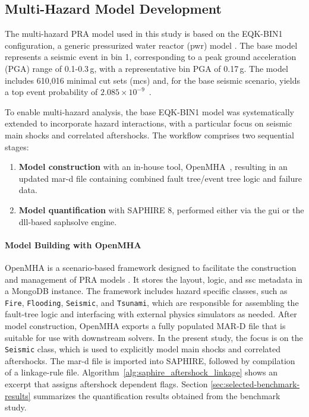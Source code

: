 \subsection{Multi-Hazard Model Development}

The multi-hazard PRA model used in this study is based on the EQK-BIN1 configuration, a generic pressurized water reactor (\acrshort{pwr}) model \cite{aras_generic_2024}. The base model represents a seismic event in bin 1, corresponding to a peak ground acceleration (PGA) range of 0.1-0.3\,g, with a representative bin PGA of 0.17\,g. The model includes 610,016 minimal cut sets (\acrshort{mcs}) and, for the base seismic scenario, yields a top event probability of $2.085 \times 10^{-9}$~\cite{batikh_time-dependent_2023}.

To enable multi-hazard analysis, the base EQK-BIN1 model was systematically extended to incorporate hazard interactions, with a particular focus on seismic main shocks and correlated aftershocks. The workflow comprises two sequential stages:

\begin{enumerate}
  \item \textbf{Model construction} with an in-house tool, OpenMHA~\cite{Batikh2024OpenMHA}, resulting in an updated \acrshort{mar-d} file containing combined fault tree/event tree logic and failure data.
  \item \textbf{Model quantification} with SAPHIRE 8, performed either via the \acrshort{gui} or the \acrshort{dll}-based \acrshort{saphsolve} engine.
\end{enumerate}

\paragraph{Model Building with OpenMHA}
OpenMHA is a scenario-based framework designed to facilitate the construction and management of PRA models \cite{batikh_towards_2025_a}. It stores the layout, logic, and \acrshort{ssc} metadata in a MongoDB \cite{MongoDB} instance. The framework includes hazard specific classes, such as \texttt{Fire}, \texttt{Flooding}, \texttt{Seismic}, and \texttt{Tsunami}, which are responsible for assembling the fault-tree logic and interfacing with external physics simulators as needed. After model construction, OpenMHA exports a fully populated MAR-D file that is suitable for use with downstream solvers. In the present study, the focus is on the \texttt{Seismic} class, which is used to explicitly model main shocks and correlated aftershocks. The \acrshort{mar-d} file is imported into SAPHIRE, followed by compilation of a linkage-rule file. Algorithm~\ref{alg:saphire_aftershock_linkage} shows an excerpt that assigns aftershock dependent flags. Section \ref{sec:selected-benchmark-results} summarizes the quantification results obtained from the benchmark study.

